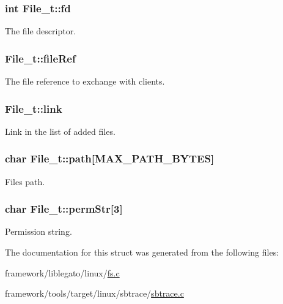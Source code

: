 \subsubsection[{\texorpdfstring{fd}{fd}}]{\setlength{\rightskip}{0pt plus 5cm}int File\+\_\+t\+::fd}\hypertarget{struct_file__t_aea84e1e696bc72ad69ed5126359807bc}{}\label{struct_file__t_aea84e1e696bc72ad69ed5126359807bc}


The file descriptor. 

\subsubsection[{\texorpdfstring{file\+Ref}{fileRef}}]{ File\+\_\+t\+::file\+Ref}\hypertarget{struct_file__t_a0cdf3f9e3ed35e42fb588720abaff401}{}\label{struct_file__t_a0cdf3f9e3ed35e42fb588720abaff401}


The file reference to exchange with clients. 

\subsubsection[{\texorpdfstring{link}{link}}]{ File\+\_\+t\+::link}\hypertarget{struct_file__t_aa485eb530821ae115002a24507750cdd}{}\label{struct_file__t_aa485eb530821ae115002a24507750cdd}


Link in the list of added files. 

\subsubsection[{\texorpdfstring{path}{path}}]{\setlength{\rightskip}{0pt plus 5cm}char File\+\_\+t\+::path\mbox{[}{\bf M\+A\+X\+\_\+\+P\+A\+T\+H\+\_\+\+B\+Y\+T\+ES}\mbox{]}}\hypertarget{struct_file__t_a70c735d041b29e756569d3dae1068700}{}\label{struct_file__t_a70c735d041b29e756569d3dae1068700}


File\textquotesingle{}s path. 

\subsubsection[{\texorpdfstring{perm\+Str}{permStr}}]{\setlength{\rightskip}{0pt plus 5cm}char File\+\_\+t\+::perm\+Str\mbox{[}3\mbox{]}}\hypertarget{struct_file__t_a78937ec566d59e81fe2f7168a2ca0918}{}\label{struct_file__t_a78937ec566d59e81fe2f7168a2ca0918}


Permission string. 



The documentation for this struct was generated from the following files\+:\begin{DoxyCompactItemize}
\item 
framework/liblegato/linux/\hyperlink{fs_8c}{fs.\+c}\item 
framework/tools/target/linux/sbtrace/\hyperlink{sbtrace_8c}{sbtrace.\+c}\end{DoxyCompactItemize}
